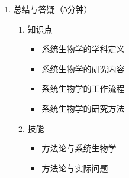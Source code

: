 \documentclass{TIJMUjiaoanLL}
\begin{document}
\begin{enumerate}
  \item 总结与答疑（5分钟）
    \begin{enumerate}
      \item 知识点
	\begin{itemize}
	  \item 系统生物学的学科定义
	  \item 系统生物学的研究内容
	  \item 系统生物学的工作流程
	  \item 系统生物学的研究方法
	\end{itemize}
      \item 技能
	\begin{itemize}
	  \item 方法论与系统生物学
    \item 方法论与实际问题
	\end{itemize}
    \end{enumerate}
\end{enumerate}

\otherTail
\end{document}
